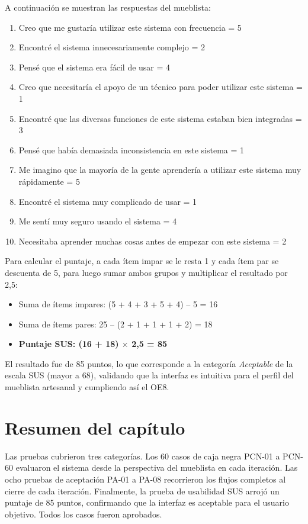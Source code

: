 ﻿\documentclass{iccmemoria}
\begin{document}
A continuación se muestran las respuestas del mueblista:

\begin{enumerate}
    \item Creo que me gustaría utilizar este sistema con frecuencia = 5
    \item Encontré el sistema innecesariamente complejo = 2
    \item Pensé que el sistema era fácil de usar = 4
    \item Creo que necesitaría el apoyo de un técnico para poder utilizar este sistema = 1
    \item Encontré que las diversas funciones de este sistema estaban bien integradas = 3
    \item Pensé que había demasiada inconsistencia en este sistema = 1
    \item Me imagino que la mayoría de la gente aprendería a utilizar este sistema muy rápidamente = 5
    \item Encontré el sistema muy complicado de usar = 1
    \item Me sentí muy seguro usando el sistema = 4
    \item Necesitaba aprender muchas cosas antes de empezar con este sistema = 2
\end{enumerate}

Para calcular el puntaje, a cada ítem impar se le resta 1 y cada ítem par se descuenta de 5, para luego sumar ambos grupos y multiplicar el resultado por 2,5:

\begin{itemize}
    \item Suma de ítems impares: (5 + 4 + 3 + 5 + 4) -- 5 = 16
    \item Suma de ítems pares: 25 -- (2 + 1 + 1 + 1 + 2) = 18
    \item \textbf{Puntaje SUS: (16 + 18) $\times$ 2{,}5 = 85}
\end{itemize}

El resultado fue de 85 puntos, lo que corresponde a la categoría \textit{Aceptable} de la escala SUS (mayor a 68), validando que la interfaz es intuitiva para el perfil del mueblista artesanal y cumpliendo así el OE8.

\section{Resumen del capítulo}
Las pruebas cubrieron tres categorías. Los 60 casos de caja negra PCN-01 a PCN-60 evaluaron el sistema desde la perspectiva del mueblista en cada iteración. Las ocho pruebas de aceptación PA-01 a PA-08 recorrieron los flujos completos al cierre de cada iteración. Finalmente, la prueba de usabilidad SUS arrojó un puntaje de 85 puntos, confirmando que la interfaz es aceptable para el usuario objetivo. Todos los casos fueron aprobados.
\end{document}
